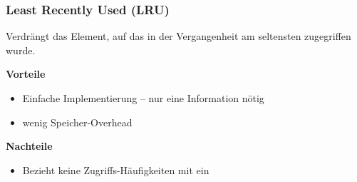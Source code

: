 \documentclass[presentation]{beamer}
\begin{document}
\begin{frame}
\frametitle{Least Recently Used (LRU)}
Verdrängt das Element, auf das in der Vergangenheit am seltensten zugegriffen wurde. \\
\vspace{0.3cm}

%	
\vspace{0.3cm}
\color{dd-gray} \textbf{Vorteile} \color{black} 
\begin{itemize}%
	\item Einfache Implementierung -- nur eine Information nötig %
	\item wenig Speicher-Overhead
\end{itemize}

\color{dd-gray} \textbf{Nachteile} \color{black} 
\begin{itemize}%
	\item Bezieht keine Zugriffs-Häufigkeiten mit ein
\end{itemize}
\end{frame}
\end{document}
